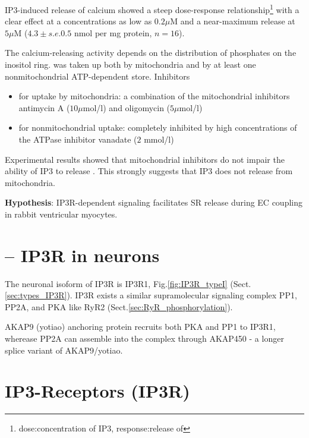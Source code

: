 


IP3-induced release of calcium showed a steep dose-response
relationship\footnote{dose:concentration of IP3, response:release of
} with a clear effect at a concentrations as low as
$0.2\mu$M and a near-maximum release at $5\mu$M ($4.3\pm s.e. 0.5$ nmol
per mg protein, $n=16$).

The calcium-releasing activity depends on the distribution of
phosphates on the inositol ring.   was taken up both by
mitochondria and by at least one nonmitochondrial ATP-dependent
 store. Inhibitors
\begin{itemize}
\item for  uptake by mitochondria: a combination of the
  mitochondrial inhibitors antimycin A ($10\mu$mol/l) and oligomycin
  ($5\mu$mol/l)
\item for nonmitochondrial  uptake: completely inhibited
  by high concentrations of the ATPase inhibitor vanadate ($2$ mmol/l) 
\end{itemize}

Experimental results showed that mitochondrial inhibitors do not
impair the ability of IP3 to release . This strongly
suggests that IP3 does not release  from mitochondria. 



{\bf Hypothesis}:  IP3R-dependent  signaling facilitates
SR  release during EC coupling in rabbit ventricular
myocytes.




\section{-- IP3R in neurons}
\label{sec:IP3R_neuron}

The neuronal isoform of IP3R is IP3R1, Fig.\ref{fig:IP3R_typeI}
(Sect.\ref{sec:types_IP3R}). IP3R exists a similar supramolecular signaling
complex PP1, PP2A, and PKA like RyR2 (Sect.\ref{sec:RyR_phosphorylation}).

AKAP9 (yotiao) anchoring protein recruits both PKA and PP1 to IP3R1, wherease
PP2A can assemble into the complex through AKAP450 - a longer splice variant of
AKAP9/yotiao.



\section{IP3-Receptors (IP3R)}
\label{sec:IP3R}

